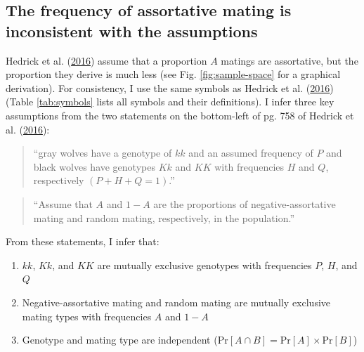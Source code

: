\documentclass[
]{article}
\providecommand{\tightlist}{%
  \setlength{\itemsep}{0pt}\setlength{\parskip}{0pt}}
\begin{document}
\hypertarget{the-frequency-of-assortative-mating-is-inconsistent-with-the-assumptions}{%
\subsection{The frequency of assortative mating is inconsistent with the assumptions}\label{the-frequency-of-assortative-mating-is-inconsistent-with-the-assumptions}}

Hedrick et al. (\protect\hyperlink{ref-hedrick_negative-assortative_2016}{2016}) assume that a proportion \(A\) matings are assortative, but the proportion they derive is much less (see Fig. \ref{fig:sample-space} for a graphical derivation). For consistency, I use the same symbols as Hedrick et al. (\protect\hyperlink{ref-hedrick_negative-assortative_2016}{2016}) (Table \ref{tab:symbols} lists all symbols and their definitions). I infer three key assumptions from the two statements on the bottom-left of pg. 758 of Hedrick et al. (\protect\hyperlink{ref-hedrick_negative-assortative_2016}{2016}):

\begin{quote}
``gray wolves have a genotype of \(\mathit{kk}\) and an assumed frequency of \(P\) and black
wolves have genotypes \(\mathit{Kk}\) and \(\mathit{KK}\) with frequencies \(H\) and \(Q\), respectively \((P + H + Q = 1)\).''
\end{quote}

\begin{quote}
``Assume that \(A\) and \(1-A\) are the proportions of negative-assortative mating and random mating, respectively, in the population.''
\end{quote}

From these statements, I infer that:

\begin{enumerate}
\def\labelenumi{\arabic{enumi}.}
\tightlist
\item
  \(\mathit{kk}\), \(\mathit{Kk}\), and \(\mathit{KK}\) are mutually exclusive genotypes with frequencies \(P\), \(H\), and \(Q\)
\item
  Negative-assortative mating and random mating are mutually exclusive mating types with frequencies \(A\) and \(1-A\)
\item
  Genotype and mating type are independent (\(\mathrm{Pr}[A \cap B] = \mathrm{Pr}[A] \times \mathrm{Pr}[B]\))
\end{enumerate}
\end{document}
